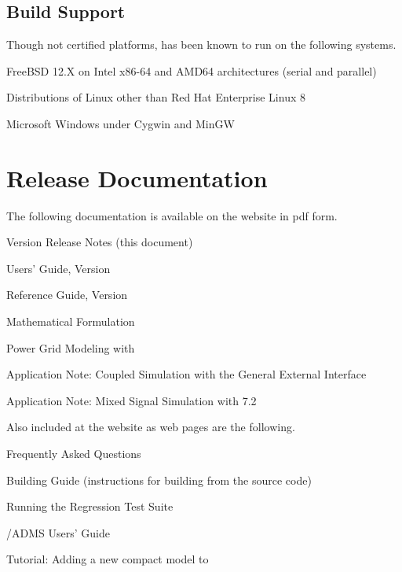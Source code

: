 \documentclass[letterpaper]{scrartcl}
\begin{document}
\subsection*{Build Support}
Though not certified platforms, \Xyce{} has been known to run on the following
systems.
\begin{XyceItemize}
  \item FreeBSD 12.X on Intel x86-64 and AMD64 architectures (serial
    and parallel)
  \item Distributions of Linux other than Red Hat Enterprise Linux 8
  \item Microsoft Windows under Cygwin and MinGW
\end{XyceItemize}


\section{\Xyce{} Release \XyceVersionVar{} Documentation}
The following \Xyce{} documentation is available on the \Xyce{} website in pdf
form.
\begin{XyceItemize}
  \item \Xyce{} Version \XyceVersionVar{} Release Notes (this document)
  \item \Xyce{} Users' Guide, Version \XyceVersionVar{}
  \item \Xyce{} Reference Guide, Version \XyceVersionVar{}
  \item \Xyce{} Mathematical Formulation
  \item Power Grid Modeling with \Xyce{}
  \item Application Note: Coupled Simulation with the \Xyce{} General
    External Interface
  \item Application Note: Mixed Signal Simulation with \Xyce{} 7.2
\end{XyceItemize}
Also included at the \Xyce{} website as web pages are the following.
\begin{XyceItemize}
  \item Frequently Asked Questions
  \item Building Guide (instructions for building \Xyce{} from the source code)
  \item Running the \Xyce{} Regression Test Suite
  \item \Xyce{}/ADMS Users' Guide
  \item Tutorial:  Adding a new compact model to \Xyce{}
\end{XyceItemize}
\end{document}
